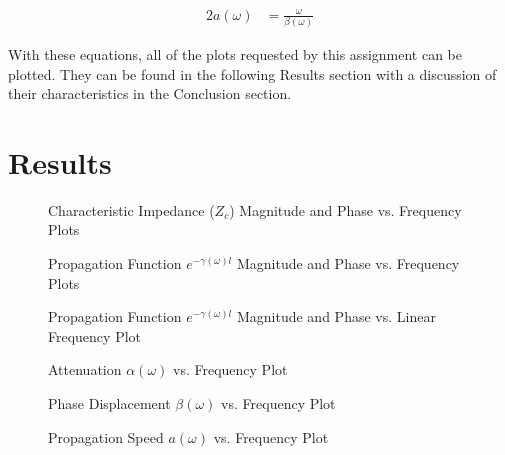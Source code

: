 \documentclass[10pt, oneside, letterpaper]{article}
\begin{document}
\begin{alignat}{2}
a(\omega{}) &= \frac{\omega}{\beta{}(\omega{})}
\end{alignat}

With these equations, all of the plots requested by this assignment can be plotted. They can be found in the following Results section with a discussion of their characteristics in the Conclusion section.

\section{Results}

\begin{figure}[H]
    \begin{center}
        
    \end{center}
    \caption{Characteristic Impedance ($Z_c$) Magnitude and Phase vs. Frequency Plots}
    \label{zc_plots}
\end{figure}
\begin{figure}[H]
    \begin{center}
        
    \end{center}
    \caption{Propagation Function $e^{-\gamma{}(\omega{})l}$ Magnitude and Phase vs. Frequency Plots}
    \label{prop_func_plots}
\end{figure}
\begin{figure}[H]
    \begin{center}
        
    \end{center}
    \caption{Propagation Function $e^{-\gamma{}(\omega{})l}$ Magnitude and Phase vs. Linear Frequency Plot}
    \label{prop_phase_plot}
\end{figure}
\begin{figure}[H]
    \begin{center}
        
    \end{center}
    \caption{Attenuation $\alpha{}(\omega{})$ vs. Frequency Plot}
    \label{attenuation_plots}
\end{figure}
\begin{figure}[H]
    \begin{center}
        
    \end{center}
    \caption{Phase Displacement $\beta{}(\omega{})$ vs. Frequency Plot}
    \label{phase_disp_plots}
\end{figure}
\begin{figure}[H]
    \begin{center}
        
    \end{center}
    \caption{Propagation Speed $a(\omega{})$ vs. Frequency Plot}
    \label{prop_speed_plots}
\end{figure}
\end{document}
